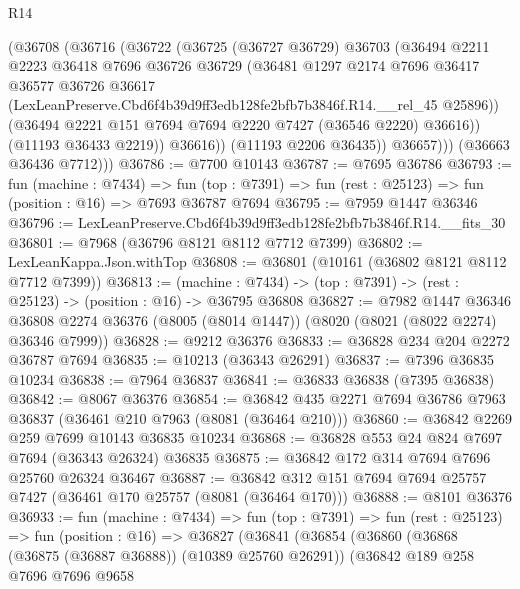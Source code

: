 \begin{lexlean}{R14}
\begin{coremodule}
              (@36708
                (@36716
                  (@36722
                    (@36725
                      (@36727 @36729)
                      @36703
                      (@36494
                        @2211
                        @2223
                        @36418
                        @7696
                        @36726
                        @36729
                        (@36481
                          @1297
                          @2174
                          @7696
                          @36417
                          @36577
                          @36726
                          @36617
                          (LexLeanPreserve.Cbd6f4b39d9ff3edb128fe2bfb7b3846f.R14.__rel_45 @25896))
                        (@36494 @2221 @151 @7694 @7694 @2220 @7427 (@36546 @2220) @36616))
                      (@11193 @36433 @2219))
                    @36616))
                (@11193 @2206 @36435))
              @36657)))
        (@36663 @36436 @7712)))
@36786 := @7700 @10143
@36787 := @7695 @36786
@36793 := fun (machine : @7434) =>
  fun (top : @7391) => fun (rest : @25123) => fun (position : @16) => @7693 @36787 @7694
@36795 := @7959 @1447 @36346
@36796 := LexLeanPreserve.Cbd6f4b39d9ff3edb128fe2bfb7b3846f.R14.__fits_30
@36801 := @7968 (@36796 @8121 @8112 @7712 @7399)
@36802 := LexLeanKappa.Json.withTop
@36808 := @36801 (@10161 (@36802 @8121 @8112 @7712 @7399))
@36813 := (machine : @7434) -> (top : @7391) -> (rest : @25123) -> (position : @16) -> @36795 @36808
@36827 := @7982
    @1447
    @36346
    @36808
    @2274
    @36376
    (@8005 (@8014 @1447))
    (@8020 (@8021 (@8022 @2274) @36346 @7999))
@36828 := @9212 @36376
@36833 := @36828 @234 @204 @2272 @36787 @7694
@36835 := @10213 (@36343 @26291)
@36837 := @7396 @36835 @10234
@36838 := @7964 @36837
@36841 := @36833 @36838 (@7395 @36838)
@36842 := @8067 @36376
@36854 := @36842 @435 @2271 @7694 @36786 @7963 @36837 (@36461 @210 @7963 (@8081 (@36464 @210)))
@36860 := @36842 @2269 @259 @7699 @10143 @36835 @10234
@36868 := @36828 @553 @24 @824 @7697 @7694 (@36343 @26324) @36835
@36875 := @36842 @172 @314 @7694 @7696 @25760 @26324 @36467
@36887 := @36842 @312 @151 @7694 @7694 @25757 @7427 (@36461 @170 @25757 (@8081 (@36464 @170)))
@36888 := @8101 @36376
@36933 := fun (machine : @7434) =>
  fun (top : @7391) =>
  fun (rest : @25123) =>
  fun (position : @16) =>
  @36827
    (@36841
      (@36854
        (@36860
          (@36868 (@36875 (@36887 @36888)) (@10389 @25760 @26291))
          (@36842
            @189
            @258
            @7696
            @7696
            @9658

\end{coremodule}
\end{lexlean}
